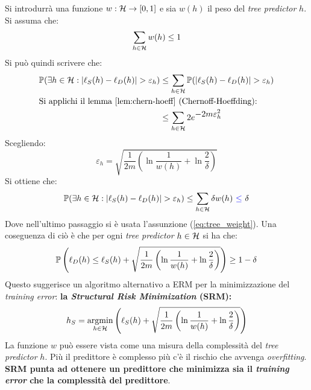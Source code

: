 Si introdurrà una funzione $w:\mathcal{H} \rightarrow [0,1]$ e sia $w(h)$ il peso del
\textit{tree predictor} $h$. Si assuma che:
\begin{equation} \sum_{h\in\mathcal{H}} w(h) \leq 1 \label{eq:tree_weight}\end{equation}
Si può quindi scrivere che:
\begin{align}
    \Prob(\exists h\in\Hpred : |\ell_S(h)-\ell_D(h)|>\varepsilon_h)
    &\leq \sum_{h\in\Hpred}\Prob(|\ell_S(h)-\ell_D(h)|>\varepsilon_h) \notag\\ 
    \multispan2{Si applichi il lemma \ref{lem:chern-hoeff}
    (Chernoff-Hoeffding):\hfill}\notag\\
    &\leq \sum_{h\in\Hpred}2e^{\displaystyle-2m\varepsilon_h^2} \notag
\end{align}
Scegliendo:
$$ \varepsilon_h = \sqrt{\frac{1}{2m}\left(\ln{\frac{1}{w(h)}
+\ln{\frac{2}{\delta}}}\right)} $$
Si ottiene che:
$$
    \Prob(\exists h\in\Hpred : |\ell_S(h)-\ell_D(h)|>\varepsilon_h)
    \leq \sum_{h\in\Hpred}\delta w(h) \
    {\color{blue}\leq} \ \delta \notag
$$
Dove nell'{\color{blue}ultimo passaggio} si è usata l'assunzione
(\ref{eq:tree_weight}). Una coseguenza di ciò è che per ogni 
\textit{tree predictor} $h\in\mathcal{H}$ si ha che:
$$ \mathbb{P}\left(\ell_D(h)\leq\ell_S(h)+
\sqrt{\frac{1}{2m}\left(\ln{\frac{1}{w(h)}
+\ln{\frac{2}{\delta}}}\right)}\right) \geq 1-\delta $$
Questo suggerisce un algoritmo alternativo a ERM per la minimizzazione del
\textit{training error}: \textbf{la \textit{Structural Risk Minimization} (SRM):}
$$ h_S = \operatorname*{argmin}_{h\in\mathcal{H}}\left(
    \ell_S(h)+\sqrt{\frac{1}{2m}\left(\ln{\frac{1}{w(h)}}
    +\ln{\frac{2}{\delta}}\right)}
\right)  $$
La funzione $w$ può essere vista come una misura della complessità del
\textit{tree predictor} $h$. Più il predittore è complesso più c'è il rischio
che avvenga \textit{overfitting}. \textbf{SRM punta ad ottenere un predittore che
minimizza sia il \textit{training error} che la complessità del predittore}.

